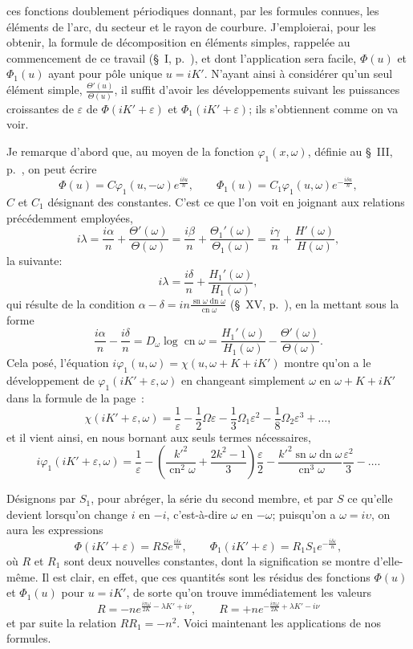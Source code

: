 \documentclass[11pt,leqno,oneside,letterpaper]{book}[2005/09/16]
\DeclareMathOperator{\sn}{sn}
\DeclareMathOperator{\cn}{cn}
\DeclareMathOperator{\dn}{dn}
\begin{document}
ces fonctions doublement p\'eriodiques donnant, par les formules connues,
les \'el\'ements de l'arc, du secteur et le rayon de courbure. J'emploierai,
pour les obtenir, la formule de d\'ecomposition en \'el\'ements simples,
rappel\'ee au commencement de ce travail (\S~I, p.~\pageref{page5}), et dont l'application
sera facile, $\Phi(u)$ et $\Phi_1(u)$ ayant pour p\^ole unique $u = iK'$. N'ayant
ainsi \`a consid\'erer qu'un seul \'el\'ement simple, $\frac{\Theta'(u)}{\Theta(u)}$, il suffit d'avoir les
d\'eveloppements suivant les puissances croissantes de $\varepsilon$ de $\Phi(iK'+ \varepsilon)$ et
$\Phi_1(iK'+ \varepsilon)$; ils s'obtiennent comme on va voir.

Je remarque d'abord que, au moyen de la fonction $\varphi_1(x,\omega)$, d\'efinie
au \S~III, p.~\pageref{page8}, on peut \'ecrire
\[
\Phi(u) = C  \varphi_1(u,-\omega) e^{\frac{i\delta u}{n}}, \qquad
\Phi_1(u)=C_1\varphi_1(u, \omega) e^{-\frac{i\delta u}{n}},
\]
$C$ et $C_1$ d\'esignant des constantes. C'est ce que l'on voit en joignant aux
relations pr\'ec\'edemment employ\'ees,
\[
  i\lambda
= \frac{i\alpha}{n} + \frac{\Theta'(\omega)}{\Theta(\omega)}
= \frac{i \beta}{n} + \frac{\Theta_1'(\omega)}{\Theta_1(\omega)}
= \frac{i\gamma}{n} + \frac{H'(\omega)}{H(\omega)} ,
\]
la suivante:
\[
  i\lambda = \frac{i\delta}{n} + \frac{H_1'(\omega)}{H_1(\omega)} ,
\]
qui r\'esulte de la condition $\alpha-\delta = in\frac{\sn\omega\dn\omega}{\cn\omega}$ (\S~XV, p.~\pageref{page36}), en la mettant
sous la forme
\[
  \frac{i\alpha}{n}-\frac{i\delta}{n} = D_{\omega} \log\cn\omega
  = \frac{H_1'(\omega)}{H_1(\omega)}
  - \frac{\Theta'(\omega)}{\Theta(\omega)} .
\]
Cela pos\'e, l'\'equation $i\varphi_1(u, \omega) = \chi(u, \omega+K+iK')$ montre qu'on a le
d\'eveloppement de $\varphi_1(iK'+\varepsilon, \omega)$ en changeant simplement $\omega$ en $\omega+K+iK'$
dans la formule de la page~\pageref{page13}:
\[
  \chi(iK'+\varepsilon,\omega) = \frac{1}{\varepsilon}
  - \frac{1}{2}\Omega\varepsilon
  - \frac{1}{3}\Omega_1\varepsilon^2
  - \frac{1}{8}\Omega_2\varepsilon^3 + \ldots ,
\]
et il vient ainsi, en nous bornant aux seuls termes n\'ecessaires,
\[
  i\varphi_1(iK'+\varepsilon,\omega) = \frac{1}{\varepsilon}
  - \left( \frac{k'^2}{\cn^2\omega}
    + \frac{2k^2-1}{3} \right) \frac{\varepsilon}{2}
  - \frac{k'^2 \sn\omega\dn\omega}{\cn^3\omega}
    \frac{\varepsilon^2}{3} - \ldots.
\]

D\'esignons par $S_1$, pour abr\'eger, la s\'erie du second membre, et par $S$
ce qu'elle devient lorsqu'on change $i$ en $-i$, c'est-\`a-dire $\omega$ en $-\omega$;
puisqu'on a $\omega = i\upsilon$, on aura les expressions
\[
  \Phi(iK'+\varepsilon) = R  S  e^{ \frac{i\delta\varepsilon}{n}}, \qquad
  \Phi_1(iK'+\varepsilon)=R_1S_1e^{-\frac{i\delta\varepsilon}{n}},
\]
o\`u $R$ et $R_1$ sont deux nouvelles constantes, dont la signification se montre
d'elle-m\^eme. Il est clair, en effet, que ces quantit\'es sont les r\'esidus des
fonctions $\Phi(u)$ et $\Phi_1(u)$ pour $u=iK'$, de sorte qu'on trouve imm\'ediatement
les valeurs
\[
  R=-ne^{ \frac{i\pi\omega}{2K}-\lambda K'+i\nu} ,\qquad
  R=+ne^{-\frac{i\pi\omega}{2K}+\lambda K'-i\nu}
\]
et par suite la relation $RR_1=-n^2$. Voici maintenant les applications de
nos formules.
\end{document}

